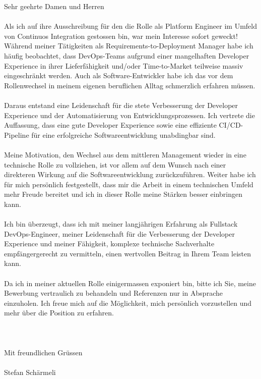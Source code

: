 \documentclass[12pt]{../developercv} %
\begin{document}
Sehr geehrte Damen und Herren
\\ \\
Als ich auf ihre Ausschreibung für den die Rolle als Platform Engineer im Umfeld von Continuos Integration gestossen bin, war mein Interesse sofort geweckt! Während meiner Tätigkeiten als Requirements-to-Deployment Manager habe ich häufig beobachtet, dass DevOps-Teams aufgrund einer mangelhaften Developer Experience in ihrer Lieferfähigkeit und/oder Time-to-Market teilweise massiv eingeschränkt werden. Auch als Software-Entwickler habe ich das vor dem Rollenwechsel in meinem eigenen beruflichen Alltag schmerzlich erfahren müssen.
\\ \\
Daraus entstand eine Leidenschaft für die stete Verbesserung der Developer Experience und der Automatisierung von Entwicklungsprozessen. Ich vertrete die Auffassung, dass eine gute Developer Experience sowie eine effiziente CI/CD-Pipeline für eine erfolgreiche Softwareentwicklung unabdingbar sind.
\\ \\
Meine Motivation, den Wechsel aus dem mittleren Management wieder in eine technische Rolle zu vollziehen, ist vor allem auf dem Wunsch nach einer direkteren Wirkung auf die Softwareentwicklung zurückzuführen. Weiter habe ich für mich persönlich festgestellt, dass mir die Arbeit in einem technischen Umfeld mehr Freude bereitet und ich in dieser Rolle meine Stärken besser einbringen kann.
\\ \\
Ich bin überzeugt, dass ich mit meiner langjährigen Erfahrung als Fullstack DevOps-Engineer, meiner Leidenschaft für die Verbesserung der Developer Experience und meiner Fähigkeit, komplexe technische Sachverhalte empfängergerecht zu vermitteln, einen wertvollen Beitrag in Ihrem Team leisten kann.
\\ \\
Da ich in meiner aktuellen Rolle einigermassen exponiert bin, bitte ich Sie, meine Bewerbung vertraulich zu behandeln und Referenzen nur in Absprache einzuholen. Ich freue mich auf die Möglichkeit, mich persönlich vorzustellen und mehr über die Position zu erfahren.
\\ \\
\\ \\
Mit freundlichen Grüssen
\\ \\
Stefan Schärmeli
\end{document}
